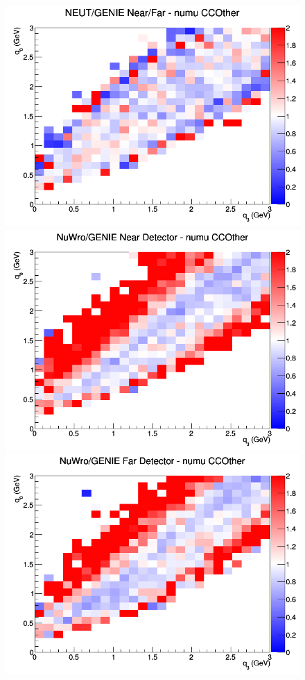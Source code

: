 \begin{figure}[h]
\endminipage
{}
\includegraphics[width=\linewidth]{eff_q0_q3/FGT/ratios/CCOther_NEUT_GENIE_numu_NF_q3_q0.png}
\endminipage
\newline
{}
\includegraphics[width=\linewidth]{eff_q0_q3/FGT/ratios/CCOther_NuWro_GENIE_numu_near_q3_q0.png}
\endminipage
{}
\includegraphics[width=\linewidth]{eff_q0_q3/FGT/ratios/CCOther_NuWro_GENIE_numu_far_q3_q0.png}

\end{figure}
